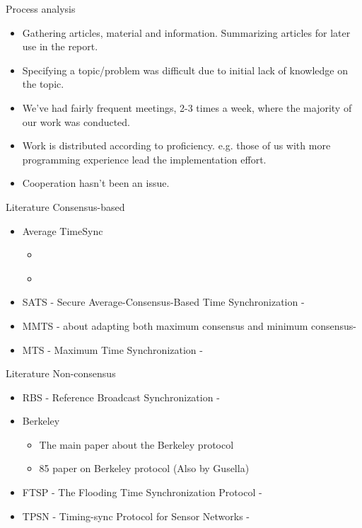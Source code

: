 \documentclass{beamer}
\begin{document}
\begin{frame}{Process analysis}
    \begin{itemize}
        \item Gathering articles, material and information. Summarizing articles for later use in the report.
        \item Specifying a topic/problem was difficult due to initial lack of knowledge on the topic. 
        \item We've had fairly frequent meetings, 2-3 times a week, where the majority of our work was conducted. 
        \item Work is distributed according to proficiency. 
        e.g. those of us with more programming experience lead the implementation effort.
        \item Cooperation hasn't been an issue.
    \end{itemize}
\end{frame}

\begin{frame}{Literature}
    Consensus-based
    
        \begin{itemize}
            \item Average TimeSync
                \begin{itemize}                        
                \item \cite{SchenatoGamba07}
                    \item \cite{LucaFiorentin11}
                \end{itemize}
            \item SATS - Secure Average-Consensus-Based Time Synchronization - \cite{HeChengShiChen13}
            \item MMTS - about adapting both maximum consensus and minimum consensus- \cite{HeLiChenCheng13}
            \item MTS - Maximum Time Synchronization - \cite{HeChengShiChen14}
        \end{itemize}
\end{frame}

\begin{frame}{Literature}
    Non-consensus
    
        \begin{itemize}
        \item  RBS - Reference Broadcast Synchronization - \cite{ElsonGirodEstrin02}
        \item Berkeley
          \begin{itemize}
          \item \cite{Gusella89} The main paper about the Berkeley protocol
          \item \cite{GusellaZatti85} 85 paper on Berkeley protocol (Also by Gusella)
          \end{itemize}
        \item FTSP - The Flooding Time Synchronization Protocol - \cite{Maroti04} 
        \item TPSN - Timing-sync Protocol for Sensor Networks - \cite{GaneriwalKumarSrivastava03}
    \end{itemize}

\end{frame}
 
\end{document}
